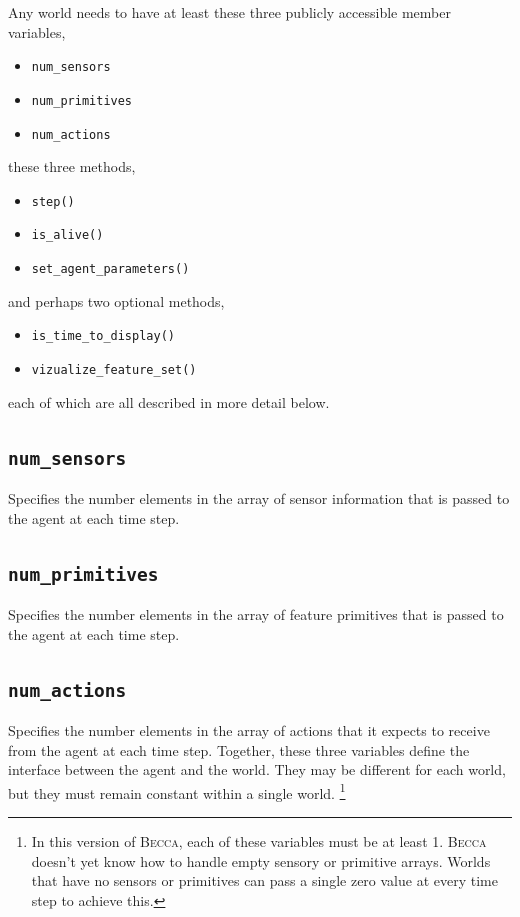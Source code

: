 Any world needs to have at least these three publicly accessible member variables,

\begin{itemize}
\item{\texttt{num\_sensors}}
\item{\texttt{num\_primitives}}
\item{\texttt{num\_actions}}
\end{itemize}

these three methods,

\begin{itemize}
\item{\texttt{step()}}
\item{\texttt{is\_alive()}}
\item{\texttt{set\_agent\_parameters()}}
\end{itemize}

and perhaps two optional methods,

\begin{itemize}
\item{\texttt{is\_time\_to\_display()}}
\item{\texttt{vizualize\_feature\_set()}}
\end{itemize}

each of which are all described in more detail below.

\subsection{\texttt{num\_sensors}}
Specifies the number elements in the array of sensor information that is passed to the agent at each time step.

\subsection{\texttt{num\_primitives}}
Specifies the number elements in the array of feature primitives that is passed to the agent at each time step.

\subsection{\texttt{num\_actions}}
Specifies the number elements in the array of actions that it expects to receive from the agent at each time step. Together, these three variables define the interface between the agent and the world. They may be different for each world, but they must remain constant within a single world. \footnote{In this version of \textsc{Becca}, each of these variables must be at least 1. \textsc{Becca} doesn't yet know how to handle empty sensory or primitive arrays. Worlds that have no sensors or primitives can pass a single zero value at every time step to achieve this.}


